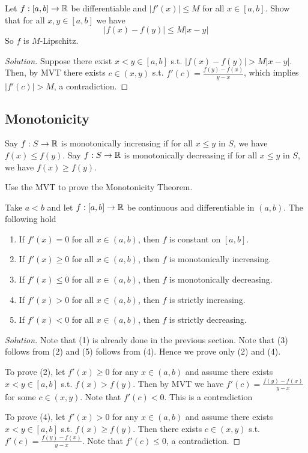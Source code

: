\begin{exercise}
  Let $f:[a,b]\to\mathbb R$ be differentiable and $|f'(x)|\leq M$ for all $x\in[a,b]$. Show that
  for all $x,y\in[a,b]$ we have 
  \[|f(x)-f(y)|\leq M|x-y|\]
  So $f$ is $M$-Lipschitz.
\end{exercise}
\begin{proof}[Solution]
  Suppose there exist $x<y\in[a,b]$ s.t. $|f(x)-f(y)|>M|x-y|$. Then, by MVT there exists
  $c\in (x,y)$ s.t. $f'(c)=\frac{f(y)-f(x)}{y-x}$, which implies $|f'(c)|>M$, a
  contradiction.
\end{proof}
\subsection{Monotonicity}
\begin{definition}
  Say $f:S\to\mathbb R$ is monotonically increasing if for all $x\leq y$ in $S$, we have
  $f(x)\leq f(y)$.
  Say $f:S\to\mathbb R$ is monotonically decreasing if for all $x\leq y$ in $S$, we have
  $f(x)\geq f(y)$.
  \label{<+label+>}
\end{definition}

\begin{exercise}
  Use the MVT to prove the Monotonicity Theorem.

  Take $a<b$ and let $f:[a,b]\to\mathbb R$ be continuous and differentiable in $(a,b)$. The
  following hold
  \begin{enumerate}
    \item If $f'(x)=0$ for all $x\in(a,b)$, then $f$ is constant on $[a,b]$.
    \item If $f'(x)\geq 0$ for all $x\in(a,b)$, then $f$ is monotonically increasing.
    \item If $f'(x)\leq 0$ for all $x\in(a,b)$, then $f$ is monotonically decreasing.
    \item If $f'(x)>0$ for all $x\in(a,b)$, then $f$ is strictly increasing.
    \item If $f'(x)<0$ for all $x\in(a,b)$, then $f$ is strictly decreasing.
  \end{enumerate}
\end{exercise}
\begin{proof}[Solution]
  Note that (1) is already done in the previous section. Note that (3) follows from (2) and (5) follows from
  (4). Hence we prove only (2) and (4). 

  To prove (2), let $f'(x)\geq 0$ for any $x\in (a,b)$ and assume there exists
  $x<y\in[a,b]$ s.t. $f(x)>f(y)$. Then by MVT we have $f'(c)=\frac{f(y)-f(x)}{y-x}$ for
  some $c\in(x,y)$. Note that $f'(c)<0$. This is a contradiction 

  To prove (4), let $f'(x)>0$ for any $x\in(a,b)$ and assume there exists
  $x<y\in[a,b]$ s.t. $f(x)\geq f(y)$. Then there exists $c\in (x,y)$ s.t.
  $f'(c)=\frac{f(y)-f(x)}{y-x}$. Note that $f'(c)\leq 0$, a contradiction.
\end{proof}

